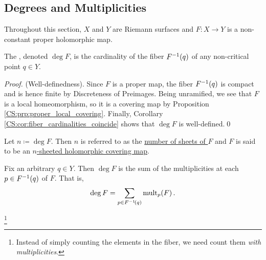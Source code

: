 \documentclass[../Moduli_Spaces_of_Riemann_Surfaces.tex]{subfiles}
\begin{document}
    \subsection{Degrees and Multiplicities}\label{CS:sec:degrees_and_multiplicities}
    Throughout this section, $X$ and $Y$ are Riemann surfaces and $F:X\to Y$ is a non-constant proper holomorphic map.
    \begin{definition}
        The , denoted $\deg F$, is the cardinality of the fiber $F^{-1}\!\left(q\right)$ of any non-critical point $q\in Y$.
    \end{definition}
    \begin{proof}
        (Well-definedness). Since $F$ is a proper map, the fiber $F^{-1}\!\left(q\right)$ is compact and is hence finite by Discreteness of Preimages. Being unramified, we see that $F$ is a local homeomorphism, so it is a covering map by Proposition \ref{CS:prp:proper_local_covering}. Finally, Corollary \ref{CS:cor:fiber_cardinalities_coincide} shows that $\deg F$ is well-defined.\qed
    \end{proof}
    \begin{remark}
        Let $n\coloneqq\deg F$. Then $n$ is referred to as the \ul{number of sheets of $F$} and $F$ is said to be an \ul{$n$-sheeted holomorphic covering map}.\exqed
    \end{remark}
    \begin{theorem}\label{CS:thm:degree_sum_of_multiplicities}
        Fix an arbitrary $q\in Y$. Then $\deg F$ is the sum of the multiplicities at each $p\in F^{-1}\!\left(q\right)$ of $F$. That is,
        \begin{equation*}
            \deg F=\sum_{p\in F^{-1}\!\left(q\right)}\operatorname{mult}_p\!\left(F\right).
        \end{equation*}
    \end{theorem}
    \footnote{Instead of simply counting the elements in the fiber, we need count them \textit{with multiplicities}.}
    \vspace{-0.1in}
\end{document}
